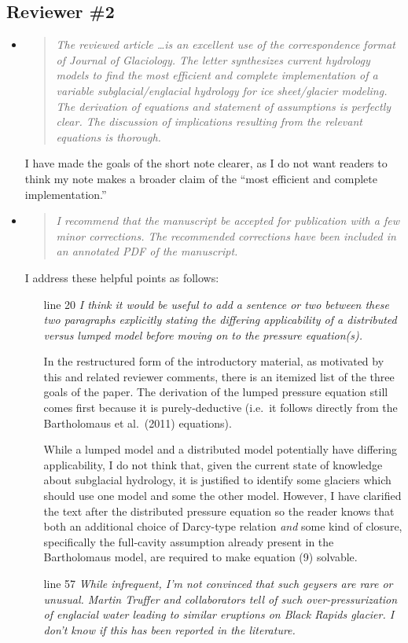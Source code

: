\documentclass[11pt,reqno]{amsart}
\newcommand{\reply}[2]{
\medskip\medskip
\item  \begin{quote}
\emph{#1}
\end{quote}

\medskip
\noindent #2}
\begin{document}
\subsection*{Reviewer \#2}  \begin{itemize}
\reply{The reviewed article \dots is an excellent use of the correspondence format of Journal of Glaciology.  The letter synthesizes current hydrology models to find the most efficient and complete implementation of a variable subglacial/englacial hydrology for ice sheet/glacier modeling.  The derivation of equations and statement of assumptions is perfectly clear.  The discussion of implications resulting from the relevant equations is thorough.}
{I have made the goals of the short note clearer, as I do not want readers to think my note makes a broader claim of the ``most efficient and complete implementation.''}

\reply{I recommend that the manuscript be accepted for publication with a few minor corrections. The recommended corrections have been included in an annotated PDF of the manuscript.}
{I address these helpful points as follows:

\medskip
\begin{itemize}
\item[line 20] \emph{I think it would be useful to add a sentence or two between these two paragraphs explicitly stating the differing applicability of a distributed versus lumped model before moving on to the pressure equation(s).}

\quad In the restructured form of the introductory material, as motivated by this and related reviewer comments, there is an itemized list of the three goals of the paper.  The derivation of the lumped pressure equation still comes first because it is purely-deductive (i.e.~it follows directly from the Bartholomaus et al.~(2011) equations).

\quad While a lumped model and a distributed model potentially have differing applicability, I do not think that, given the current state of knowledge about subglacial hydrology, it is justified to identify some glaciers which should use one model and some the other model. However, I have clarified the text after the distributed pressure equation so the reader knows that both an additional choice of Darcy-type relation \emph{and} some kind of closure, specifically the full-cavity assumption already present in the Bartholomaus model, are required to make equation (9) solvable.

\item[line 57]  \emph{While infrequent, I'm not convinced that such geysers are rare or unusual.  Martin Truffer and collaborators tell of such over-pressurization of  englacial water leading to similar eruptions on Black Rapids glacier.   I don't know if this has been reported in the literature.}


\end{itemize}}
\end{itemize}
\end{document}
